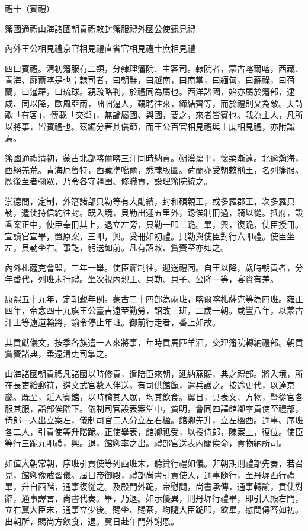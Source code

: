 
\begin{pinyinscope}
禮十（賓禮）

籓國通禮山海諸國朝貢禮敕封籓服禮外國公使覲見禮

內外王公相見禮京官相見禮直省官相見禮士庶相見禮

四曰賓禮。清初籓服有二類，分隸理籓院、主客司。隸院者，蒙古喀爾喀，西藏、青海、廓爾喀是也；隸司者，曰朝鮮，曰越南，曰南掌，曰緬甸，曰蘇祿，曰荷蘭，曰暹羅，曰琉球。親疏略判，於禮同為屬也。西洋諸國，始亦屬於籓部，逮咸、同以降，歐風亞雨，咄咄逼人，覲聘往來，締結齊等，而於禮則又為敵。夫詩歌「有客」，傳載「交鄰」，無論屬國、與國，要之，來者皆賓也。我為主人，凡所以將事，皆賓禮也。茲編分著其儀節，而王公百官相見禮與士庶相見禮，亦附識焉。

籓國通禮清初，蒙古北部喀爾喀三汗同時納貢。朔漠蕩平，懷柔漸遠。北逾瀚海，西絕羌荒。青海厄魯特，西藏準噶爾，悉隸版圖。荷蘭亦受朝敕稱王，名列籓服。厥後至者彌眾，乃令各守疆圉、修職貢，設理籓院統之。

崇德間，定制，外籓諸部貝勒等有大勛績，封和碩親王，或多羅郡王，次多羅貝勒，遣使持信約往封。既入境，貝勒出迎五里外，跽俟制冊過，騎以從。抵府，設香案正中，使臣奉冊其上，退立左旁，貝勒一叩三跪。畢，興，復跪，使臣授冊。宣讀官宣畢，置原案，三叩，興。受冊如初禮。貝勒與使臣對行六叩禮。使臣坐左，貝勒坐右。事訖，躬送如前。凡有詔敕、賞賚至亦如之。

內外札薩克會盟，三年一舉。使臣齎制往，迎送禮同。自王以降，歲時朝貢者，分年番代，列班末行禮。坐次視內親王、貝勒、貝子、公降一等，宴賚有差。

康熙五十九年，定朝覲年例。蒙古二十四部為兩班，喀爾喀札薩克等為四班。雍正四年，帝念四十九旗王公臺吉遠至勤勞，詔改三班，二歲一朝。咸豐八年，以蒙古汗王等遠道輸將，諭令停止年班。御前行走者，番上如故。

其貢獻儀文，按季各旗遣一人來將事，年時貢馬匹羊酒，交理籓院轉納禮部。朝貢賞賚諸典，柔遠清吏司掌之。

山海諸國朝貢禮凡諸國以時修貢，遣陪臣來朝，延納燕賜，典之禮部。將入境，所在長吏給郵符，遴文武官數人伴送。有司供館餼，遣兵護之。按途更代，以達京畿。既至，延入賓館，以時稽其人眾，均其飲食。翼日，具表文、方物，暨從官各服其服，詣部俟階下。儀制司官設表案堂中，質明，會同四譯館卿率貢使至禮部，侍郎一人出立案左，儀制司官二人分立左右楹。館卿先升，立左楹西。通事、序班各二人，引貢使等升階跪。正使舉表，館卿祗受，以授侍郎，陳案上，復位。使臣等行三跪九叩禮，興。退，館卿率之出。禮部官送表內閣俟命，貢物納所司。

如值大朝常朝，序班引貢使等列西班末，聽贊行禮如儀。非朝期則禮部先奏，若召見，館卿豫戒習儀。屆日帝御殿，禮部尚書引貢使入，通事隨行，至丹墀西行禮畢，升自西階，通事復從之。及殿門外跪，帝慰問，尚書承傳，通事轉諭，貢使對辭，通事譯言，尚書代奏。畢，乃退。如示優異，則丹墀行禮畢，即引入殿右門，立右翼大臣末，通事立少後。賜坐、賜茶，均隨大臣跪叩，飲畢，慰問傳答如初。出朝所，賜尚方飲食，退。翼日赴午門外謝恩。


\end{pinyinscope}
